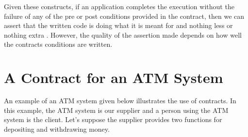 Given these constructs, if an application completes the execution without the failure of any of the pre or post conditions provided in the contract, then we can assert that the written code is doing what it is meant for and nothing less or nothing extra \cite{DesignByContractByExample}.
However, the quality of the assertion made depends on how well the contracts conditions are written. 

\section{A Contract for an ATM System}

An example of an ATM system given below illustrates the use of contracts.
In this example, the ATM system is our supplier and a person using the ATM system is the client. Let's suppose the supplier provides two functions for depositing and withdrawing money.
